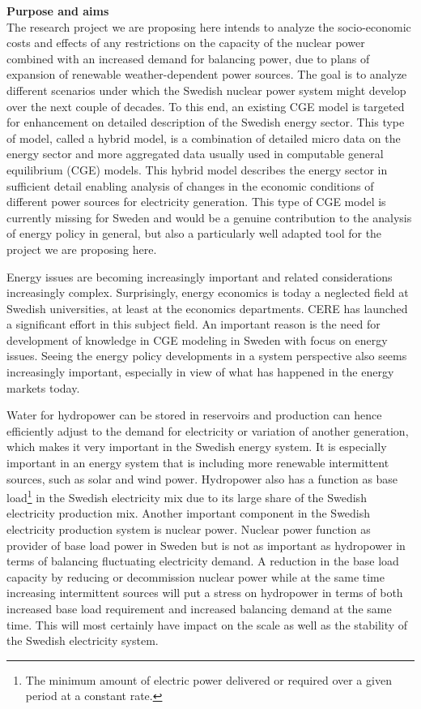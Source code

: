 \textbf{Purpose and aims}\\
The research project we are proposing here intends to analyze the socio-economic costs and effects of any restrictions on the capacity of the nuclear power combined with an increased demand for balancing power, due to plans of expansion of renewable weather-dependent power sources. The goal is to analyze different scenarios under which the Swedish nuclear power system might develop over the next couple of decades. To this end, an existing CGE model is targeted for enhancement on detailed description of the Swedish energy sector. This type of model, called a hybrid model, is a combination of detailed micro data on the energy sector and more aggregated data usually used in computable general equilibrium (CGE) models. This hybrid model describes the energy sector in sufficient detail enabling analysis of changes in the economic conditions of different power sources for electricity generation. This type of CGE model is currently missing for Sweden and would be a genuine contribution to the analysis of energy policy in general, but also a particularly well adapted tool for the project we are proposing here.

Energy issues are becoming increasingly important and related considerations increasingly complex. Surprisingly, energy economics is today a neglected field at Swedish universities, at least at the economics departments. CERE has launched a significant effort in this subject field. An important reason is the need for development of knowledge in CGE modeling in Sweden with focus on energy issues. Seeing the energy policy developments in a system perspective also seems increasingly important, especially in view of what has happened in the energy markets today.

Water for hydropower can be stored in reservoirs and production can hence efficiently adjust to the demand for electricity or variation of another generation, which makes it very important in the Swedish energy system. It is especially important in an energy system that is including more renewable intermittent sources, such as solar and wind power. Hydropower also has a function as base load\footnote{The minimum amount of electric power delivered or required over a given period at a constant rate.} in the Swedish electricity mix due to its large share of the Swedish electricity production mix. Another important component in the Swedish electricity production system is nuclear power. Nuclear power function as provider of base load power in Sweden but is not as important as hydropower in terms of balancing fluctuating electricity demand. A reduction in the base load capacity by reducing or decommission nuclear power while at the same time increasing intermittent sources will put a stress on hydropower in terms of both increased base load requirement and increased balancing demand at the same time. This will most certainly have impact on the scale as well as the stability of the Swedish electricity system.

